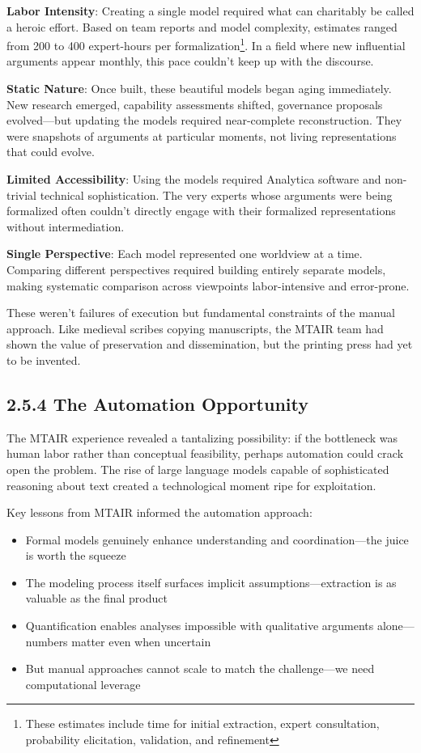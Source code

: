 \documentclass[
  11pt,
  letterpaper,
]{book}
\providecommand{\tightlist}{%
  \setlength{\itemsep}{0pt}\setlength{\parskip}{0pt}}
\begin{document}
\textbf{Labor Intensity}: Creating a single model required what can
charitably be called a heroic effort. Based on team reports and model
complexity, estimates ranged from 200 to 400 expert-hours per
formalization\footnote{These estimates include time for initial
  extraction, expert consultation, probability elicitation, validation,
  and refinement}. In a field where new influential arguments appear
monthly, this pace couldn't keep up with the discourse.

\textbf{Static Nature}: Once built, these beautiful models began aging
immediately. New research emerged, capability assessments shifted,
governance proposals evolved---but updating the models required
near-complete reconstruction. They were snapshots of arguments at
particular moments, not living representations that could evolve.

\textbf{Limited Accessibility}: Using the models required Analytica
software and non-trivial technical sophistication. The very experts
whose arguments were being formalized often couldn't directly engage
with their formalized representations without intermediation.

\textbf{Single Perspective}: Each model represented one worldview at a
time. Comparing different perspectives required building entirely
separate models, making systematic comparison across viewpoints
labor-intensive and error-prone.

These weren't failures of execution but fundamental constraints of the
manual approach. Like medieval scribes copying manuscripts, the MTAIR
team had shown the value of preservation and dissemination, but the
printing press had yet to be invented.

\subsection{2.5.4 The Automation
Opportunity}\label{sec-automation-opportunity}

The MTAIR experience revealed a tantalizing possibility: if the
bottleneck was human labor rather than conceptual feasibility, perhaps
automation could crack open the problem. The rise of large language
models capable of sophisticated reasoning about text created a
technological moment ripe for exploitation.

Key lessons from MTAIR informed the automation approach:

\begin{itemize}
\tightlist
\item
  Formal models genuinely enhance understanding and coordination---the
  juice is worth the squeeze
\item
  The modeling process itself surfaces implicit assumptions---extraction
  is as valuable as the final product
\item
  Quantification enables analyses impossible with qualitative arguments
  alone---numbers matter even when uncertain
\item
  But manual approaches cannot scale to match the challenge---we need
  computational leverage
\end{itemize}
\end{document}
